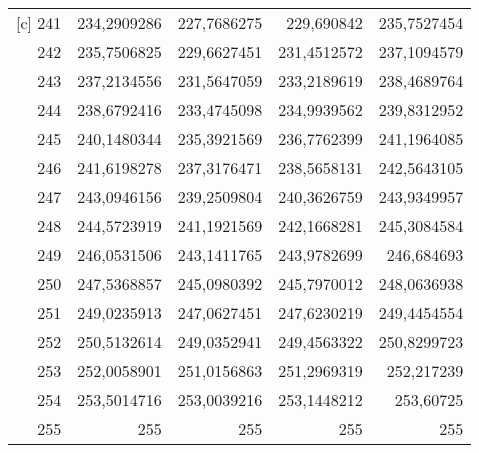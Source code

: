 \begin{longtable}{r|rrrr}[c]
    241   & 234,2909286 & 227,7686275 & 229,690842 & 235,7527454 \\
    242   & 235,7506825 & 229,6627451 & 231,4512572 & 237,1094579 \\
    243   & 237,2134556 & 231,5647059 & 233,2189619 & 238,4689764 \\
    244   & 238,6792416 & 233,4745098 & 234,9939562 & 239,8312952 \\
    245   & 240,1480344 & 235,3921569 & 236,7762399 & 241,1964085 \\
    246   & 241,6198278 & 237,3176471 & 238,5658131 & 242,5643105 \\
    247   & 243,0946156 & 239,2509804 & 240,3626759 & 243,9349957 \\
    248   & 244,5723919 & 241,1921569 & 242,1668281 & 245,3084584 \\
    249   & 246,0531506 & 243,1411765 & 243,9782699 & 246,684693 \\
    250   & 247,5368857 & 245,0980392 & 245,7970012 & 248,0636938 \\
    251   & 249,0235913 & 247,0627451 & 247,6230219 & 249,4454554 \\
    252   & 250,5132614 & 249,0352941 & 249,4563322 & 250,8299723 \\
    253   & 252,0058901 & 251,0156863 & 251,2969319 & 252,217239 \\
    254   & 253,5014716 & 253,0039216 & 253,1448212 & 253,60725 \\
    255   & 255   & 255   & 255   & 255 \\
\end{longtable}    